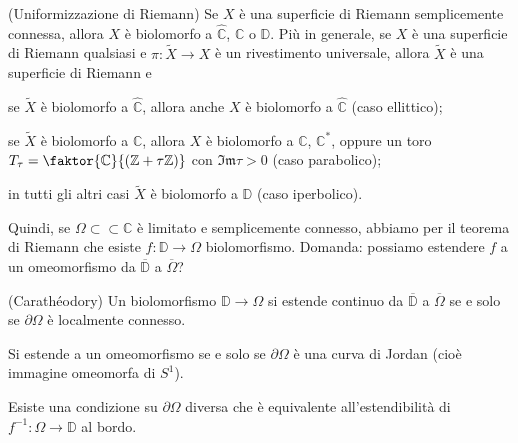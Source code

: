 \begin{thm}
  (Uniformizzazione di Riemann) Se $X$ è una superficie di Riemann semplicemente connessa, allora $X$ è biolomorfo a $\widehat{\mathbb{C}}$, $\mathbb{C}$ o $\mathbb{D}$. Più in generale, se $X$ è una superficie di Riemann qualsiasi e $\pi:\widetilde{X} \longrightarrow X$ è un rivestimento universale, allora $\widetilde{X}$ è una superficie di Riemann e
  \begin{nlist}
    \item se $\widetilde{X}$ è biolomorfo a $\widehat{\mathbb{C}}$, allora anche $X$ è biolomorfo a $\widehat{\mathbb{C}}$ (caso ellittico);
    \item se $\widetilde{X}$ è biolomorfo a $\mathbb{C}$, allora $X$ è biolomorfo a $\mathbb{C}$, $\mathbb{C}^*$, oppure un toro $T_{\tau}=\faktor{\mathbb{C}}{(\mathbb{Z}+\tau \mathbb{Z})}$ con $\mathfrak{Im}\tau>0$ (caso parabolico);
    \item in tutti gli altri casi $\widetilde{X}$ è biolomorfo a $\mathbb{D}$ (caso iperbolico).
  \end{nlist}
\end{thm}

Quindi, se $\Omega \subset\subset \mathbb{C}$ è limitato e semplicemente connesso, abbiamo per il teorema di Riemann che esiste $f:\mathbb{D} \longrightarrow \Omega$ biolomorfismo. Domanda: possiamo estendere $f$ a un omeomorfismo da $\overline{\mathbb{D}}$ a $\overline{\Omega}$?

\begin{thm}
  (Carathéodory) Un biolomorfismo $\mathbb{D} \longrightarrow \Omega$ si estende continuo da $\overline{\mathbb{D}}$ a $\overline{\Omega}$ se e solo se $\partial \Omega$ è localmente connesso.
\end{thm}

\begin{cor}
  Si estende a un omeomorfismo se e solo se $\partial\Omega$ è una curva di Jordan (cioè immagine omeomorfa di $S^1$).
\end{cor}

Esiste una condizione su $\partial\Omega$ diversa che è equivalente all'estendibilità di $f^{-1}:\Omega \longrightarrow \mathbb{D}$ al bordo.
